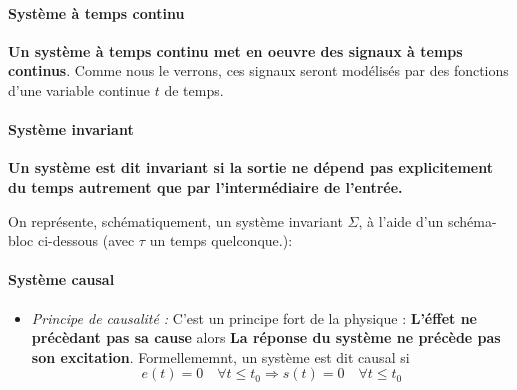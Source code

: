 \paragraph{Système à temps continu}
\textbf{Un système à temps continu met en oeuvre des signaux 
à temps continus}. Comme nous le verrons, ces signaux seront
modélisés par des fonctions d'une variable continue $t$ de temps.
\paragraph{Système invariant}
\textbf{Un système est dit invariant si la sortie ne dépend pas 
explicitement du temps autrement que par l'intermédiaire de l'entrée.}

On représente, schématiquement, un système invariant $\Sigma$, à 
l'aide d'un schéma-bloc ci-dessous 
(avec $\tau$ un temps quelconque.): 
\begin{center}
    
\end{center}
\paragraph{Système causal}
\begin{itemize}
    \item \emph{Principe de causalité :}
        C'est un principe fort de la physique :
        \textbf{\og L'éffet ne précèdant pas sa cause\fg} alors 
        \textbf{\og La réponse du système ne précède pas son excitation\fg}.
        Formellememnt, un système est dit causal si 
        \[ e(t)=0\quad\forall t\le t_0 \Rightarrow s(t)=0\quad\forall t\le t_0\]
\end{itemize}
